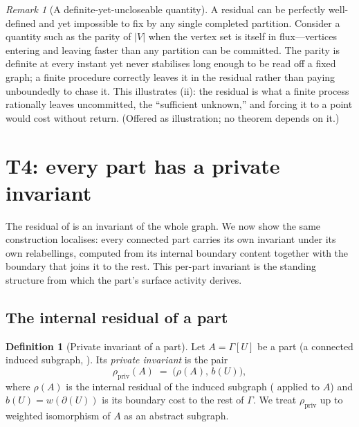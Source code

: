 \documentclass[11pt,a4paper]{article}
\theoremstyle{thmstyle}
\theoremstyle{definition}
\newtheorem{definition}[theorem]{Definition}
\theoremstyle{remark}
\newtheorem{remark}[theorem]{Remark}
\newcommand{\Gph}{\Gamma}                 %
\newcommand{\V}{V}                        %
\newcommand{\wt}{w}                       %
\newcommand{\cut}{\partial}               %
\newcommand{\Agent}{A}                    %
\newcommand{\Res}{\rho}                   %
\newcommand{\abs}[1]{\lvert#1\rvert}
\begin{document}
\begin{remark}[A definite-yet-uncloseable quantity]
\label{rem:cat-parity}
A residual can be perfectly well-defined and yet impossible to fix by any single
completed partition. Consider a quantity such as the parity of $\abs{\V}$ when
the vertex set is itself in flux---vertices entering and leaving faster than any
partition can be committed. The parity is definite at every instant yet never
stabilises long enough to be read off a fixed graph; a finite procedure
correctly leaves it in the residual rather than paying unboundedly to chase it.
This illustrates (ii): the residual is what a finite
process rationally leaves uncommitted, the ``sufficient unknown,'' and forcing it
to a point would cost without return. (Offered as illustration; no theorem
depends on it.)
\end{remark}


\section{T4: every part has a private invariant}
\label{sec:invariant}

The residual of  is an invariant of the whole graph. We now
show the same construction localises: every connected part carries its own
invariant under its own relabellings, computed from its internal boundary
content together with the boundary that joins it to the rest. This per-part
invariant is the standing structure from which the part's surface activity
derives.

\subsection{The internal residual of a part}

\begin{definition}[Private invariant of a part]
\label{def:private}
Let $\Agent=\Gph[U]$ be a part (a connected induced subgraph,
). Its \emph{private invariant} is the pair
\[
\Res_{\mathrm{priv}}(\Agent)\;=\;\bigl(\Res(\Agent),\,b(U)\bigr),
\]
where $\Res(\Agent)$ is the internal residual of the induced subgraph
\textup{(} applied to $\Agent$\textup{)} and $b(U)=\wt(\cut(U))$
is its boundary cost to the rest of $\Gph$. We treat $\Res_{\mathrm{priv}}$ up to
weighted isomorphism of $\Agent$ as an abstract subgraph.
\end{definition}
\end{document}

